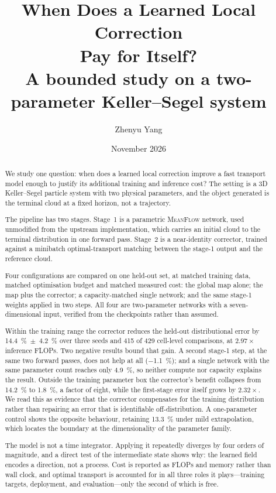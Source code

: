 ﻿\documentclass[11pt,a4paper]{article}
\title{\vspace{-1.2cm}\bfseries When Does a Learned Local Correction\\ Pay for Itself?\\[0.35em]
\large A bounded study on a two-parameter Keller--Segel system}
\author{Zhenyu Yang}
\date{November 2026}
\newcommand{\mf}{\textsc{MeanFlow}}
\begin{document}
\maketitle

\begin{abstract}
\noindent
We study one question: when does a learned local correction improve a fast transport model
enough to justify its additional training and inference cost? The setting is a 3D
Keller--Segel particle system with two physical parameters, and the object generated is the
terminal cloud at a fixed horizon, not a trajectory.

The pipeline has two stages. Stage~1 is a parametric \mf{} network, used unmodified from the
upstream implementation, which carries an initial cloud to the terminal distribution in one
forward pass. Stage~2 is a near-identity corrector, trained against a minibatch
optimal-transport matching between the stage-1 output and the reference cloud.

Four configurations are compared on one held-out set, at matched training data, matched
optimisation budget and matched measured cost: the global map alone; the map plus the
corrector; a capacity-matched single network; and the same stage-1 weights applied in two
steps. All four are two-parameter networks with a seven-dimensional input, verified from the
checkpoints rather than assumed.

Within the training range the corrector reduces the held-out distributional error by
\SI{14.4}{\percent}~$\pm$~\SI{4.2}{\percent} over three seeds and 415 of 429 cell-level
comparisons, at $2.97\times$ inference FLOPs. Two negative results bound that gain. A second
stage-1 step, at the same two forward passes, does not help at all (\SI{-1.1}{\percent}); and
a single network with the same parameter count reaches only \SI{4.9}{\percent}, so neither
compute nor capacity explains the result. Outside the training parameter box the corrector's
benefit collapses from \SI{14.2}{\percent} to \SI{1.8}{\percent}, a factor of eight, while the
first-stage error itself grows by $2.32\times$. We read this as evidence that the corrector
compensates for the training distribution rather than repairing an error that is identifiable
off-distribution. A one-parameter control shows the opposite behaviour, retaining
\SI{13.3}{\percent} under mild extrapolation, which locates the boundary at the dimensionality
of the parameter family.

The model is not a time integrator. Applying it repeatedly diverges by four orders of
magnitude, and a direct test of the intermediate state shows why: the learned field encodes a
direction, not a process. Cost is reported as FLOPs and memory rather than wall clock, and
optimal transport is accounted for in all three roles it plays---training targets,
deployment, and evaluation---only the second of which is free.
\end{abstract}
\end{document}
